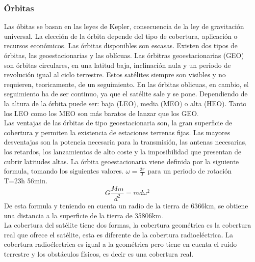 	\subsubsection{Órbitas}
	\label{ssub:orbitas}
		Las óbitas se basan en las leyes de Kepler, consecuencia de la ley de gravitación universal. La elección de la órbita depende del tipo de cobertura, aplicación o recursos económicos. Las órbitas disponibles son escasas. Existen dos tipos de órbitas, las geoestacionarias y las oblícuas. Las órbitras geoestacionarias (GEO) son órbitas circulares, en una latitud baja, inclinación nula y un periodo de revolución igual al ciclo terrestre. Estos satélites siempre son visibles y no requieren, teoricamente, de un seguimiento. En las órbitas oblicuas, en cambio, el seguimiento ha de ser continuo, ya que el satélite sale y se pone. Dependiendo de la altura de la órbita puede ser: baja (LEO), media (MEO) o alta (HEO). Tanto los LEO como los MEO son más baratos de lanzar que los GEO.\\
		Las ventajas de las órbitas de tipo geoestacionaria son, la gran superficie de cobertura y permiten la existencia de estaciones terrenas fijas. Las mayores desventajas son la potencia necesaria para la transmisión, las antenas necesarias, los retardos, los lanzamientos de alto coste y la imposibilidad que presentan de cubrir latitudes altas.
		La órbita geoestacionaria viene definida por la siguiente formula, tomando los siguientes valores. $\omega=\frac{2\pi}{T}$ para un periodo de rotación T=23h 56min.
		\[G\frac{Mm}{d^2}=md\omega^2\]
		De esta formula y teniendo en cuenta un radio de la tierra de 6366km, se obtiene una distancia a la superficie de la tierra de 35806km.\\
		La cobertura del satélite tiene dos formas, la cobertura geométrica es la cobertura real que ofrece el satélite, esta es diferente de la cobertura radioeléctrica. La cobertura radioélectrica es igual a la geométrica pero tiene en cuenta el ruido terrestre y los obstáculos físicos, es decir es una cobertura real.

